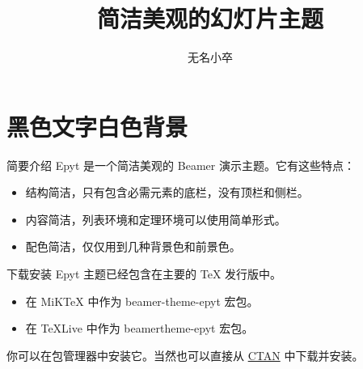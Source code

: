 \documentclass[14pt,notheorems]{beamer}
\newcommand{\mylead}[1]{\textcolor{acolor1}{#1}}
\newcommand{\mybold}[1]{\textcolor{acolor2}{#1}}
\begin{document}
\title{简洁美观的幻灯片主题}
\author{无名小卒}

\begin{frame}[plain]\transboxout
\titlepage
\end{frame}


\section{黑色文字白色背景}

\begin{frame}{简要介绍}
\mylead{Epyt} 是一个简洁美观的 Beamer 演示主题。它有这些特点：\pause
\begin{itemize}[<+->]
\item 结构简洁，只有包含必需元素的底栏，没有顶栏和侧栏。
\item 内容简洁，列表环境和定理环境可以使用简单形式。
\item 配色简洁，仅仅用到几种背景色和前景色。
\end{itemize}
\end{frame}

\begin{frame}{下载安装}
\mylead{Epyt} 主题已经包含在主要的 TeX 发行版中。
\begin{itemize}
  \item 在 MiKTeX 中作为 \mybold{beamer-theme-epyt} 宏包。
  \item 在 TeXLive 中作为 \mybold{beamertheme-epyt} 宏包。
\end{itemize}
你可以在包管理器中安装它。当然也可以直接从
\href{https://www.ctan.org/pkg/beamertheme-epyt}{CTAN} 中下载并安装。
\end{frame}

\end{document}
